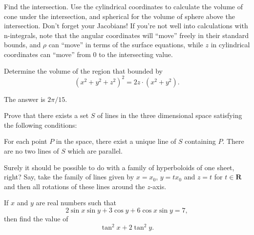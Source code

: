 \documentclass[12pt,a4paper]{memoir}
\theoremstyle{definition}
\begin{document}
\begin{solution}[name={Harun Šiljak's Hint}]
	Find the intersection. Use the cylindrical coordinates to calculate the volume of cone under the intersection, and spherical for the volume of sphere above the intersection. Don't forget your Jacobians!
	If you're not well into calculations with n-integrals, note that the angular coordinates will ``move'' freely in their standard bounds, and $ \rho$ can ``move'' in terms of the surface equations, while $ z$ in cylindrical coordinates can ``move'' from 0 to the intersecting value.
\end{solution}



\begin{question}[name={Wisheskernel's Spherical Coordinates}]
	Determine the volume of the region that bounded by $$ \left( x^{2}+y^{2}+z^{2} \right)^{2}=2z \cdot \left( x^{2}+y^{2}  \right).$$
\end{question}

\begin{solution}
	The answer is $2\pi/15$.
\end{solution}



\begin{question}[name={2010 Olympic Revenge}]
	Prove that there exists a set $S$ of lines in the three dimensional space satisfying the following conditions:
	\begin{tasks}
		\task For each point $P$ in the space, there exist a unique line of $S$ containing $P$.
		\task There are no two lines of $S$ which are parallel.
	\end{tasks}
\end{question}

\begin{solution}[name={Solution by JBL}]
	Surely it should be possible to do with a family of hyperboloids of one sheet, right? Say, take the family of lines given by $x = x_0$, $y = tx_0$ and $z = t$ for $t \in \mathbf{R}$ and then all rotations of these lines around the $z$-axis.
\end{solution}


\begin{question} 
	If $x$ and $y$ are real numbers such that $$2\sin x \sin y + 3 \cos y + 6\cos x \sin y=7,$$ then find the value of $$ \tan^2 x+2\tan^2 y.$$
\end{question}
\end{document}
